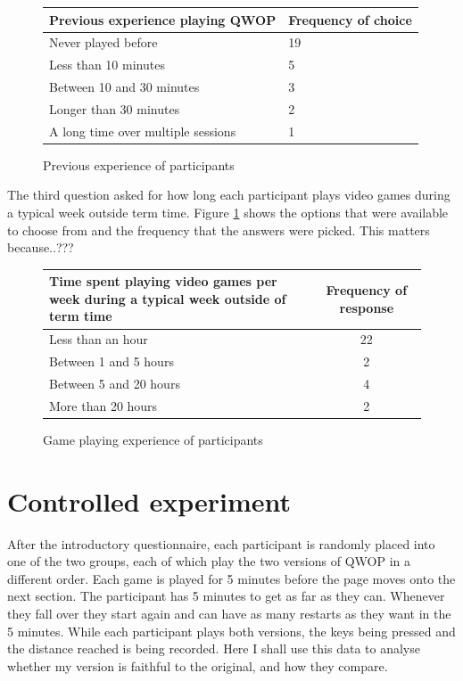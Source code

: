 \documentclass[12pt,a4paper,twoside,openright]{report}
\begin{document}
\begin{figure}[tbh]
\begin{center}
\begin{tabular}{ |l|l| }
  \hline
  Previous experience playing QWOP   & Frequency of choice \\ \hline \hline 
  Never played before                & 19 \\ \hline
  Less than 10 minutes               & 5  \\ \hline
  Between 10 and 30 minutes          & 3  \\ \hline
  Longer than 30 minutes             & 2  \\ \hline
  A long time over multiple sessions & 1  \\ \hline
\end{tabular}
\end{center}
\caption{Previous experience of participants}
\label{previousExperienceTable}
\end{figure}


The third question asked for how long each participant plays video games during a typical week outside term time. Figure \ref{previousExperienceTable} shows the options that were available to choose from and the frequency that the answers were picked.
This matters because..???

\begin{figure}[tbh]
\begin{center}
\begin{tabular}{ |p{8cm}|c| }
  \hline
Time spent playing video games per week during a typical week outside of term time & Frequency of response \\ \hline \hline
Less than an hour      & 22 \\ \hline
Between 1 and 5 hours  & 2  \\ \hline
Between 5 and 20 hours & 4  \\ \hline
More than 20 hours     & 2  \\ \hline
\end{tabular}
\end{center}
\caption{Game playing experience of participants}
\label{gamesExperienceTable}
\end{figure}

\section{Controlled experiment}

After the introductory questionnaire, each participant is randomly placed into one of the two groups, each of which play the two versions of QWOP in a different order. Each game is played for 5 minutes before the page moves onto the next section. 
The participant has 5 minutes to get as far as they can. Whenever they fall over they start again and can have as many restarts as they want in the 5 minutes.
While each participant plays both versions, the keys being pressed and the distance reached is being recorded. Here I shall use this data to analyse whether my version is faithful to the original, and how they compare.
\end{document}
